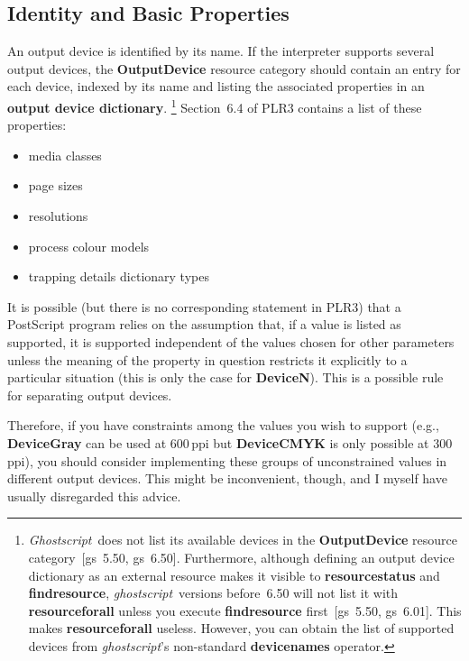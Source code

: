 \documentclass[twoside,a4paper]{article}
\newcommand{\gs}{\textit{ghostscript\/}}
\newcommand{\Gs}{\textit{Ghostscript\/}}
\newcommand{\ps}[1]{{\sffamily\bfseries #1}}	%
\renewcommand{\d}[1]{{\bfseries #1}}	%
\begin{document}

\subsection{Identity and Basic Properties}

An output device is identified by its name.
If the interpreter supports several output devices,
the \ps{OutputDevice} resource category should contain an entry for each device,
indexed by its name and listing the associated properties in an
\d{output device dictionary}.%
  \footnote{\Gs\ does not list its available devices in the \ps{OutputDevice}
    resource category~[gs~5.50, gs~6.50].
    Furthermore, although defining an output device dictionary as an external
    resource makes it visible to \ps{resourcestatus} and \ps{findresource},
    \gs\ versions before~6.50 will not list it with \ps{resourceforall} unless
    you execute \ps{findresource} first~[gs~5.50, gs~6.01].
    This makes \ps{resourceforall} useless.
    However, you can obtain the list of supported devices from \gs's
    non-standard \ps{devicenames} operator.
  }
Section~6.4 of PLR3 contains a list of these properties:
\begin{itemize}
  \item media classes
  \item page sizes
  \item resolutions
  \item process colour models
  \item trapping details dictionary types
\end{itemize}
It is possible (but there is no corresponding statement in PLR3)
that a PostScript program relies on the assumption that,
if a value is listed as supported,
it is supported independent of the values chosen for other parameters
unless the meaning of the property in question restricts it explicitly to a
particular situation (this is only the case for \ps{DeviceN}).
This is a possible rule for separating output devices.

Therefore, if you have constraints among the values you wish to support
(e.g., \ps{DeviceGray} can be used at 600\,ppi but \ps{DeviceCMYK} is only
possible at 300\,ppi),
you should consider implementing these groups of unconstrained values
in different output devices.
This might be inconvenient, though,
and I myself have usually disregarded this advice.

\end{document}

